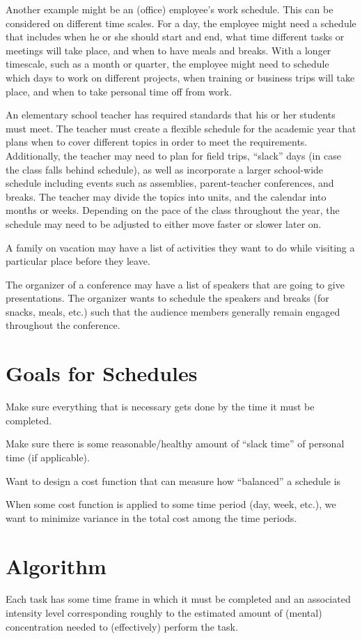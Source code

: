 \documentclass{article}
\begin{document}
	Another example might be an (office) employee's work schedule. This can be considered on different time scales. For a day, the employee might need a schedule that includes when he or she should start and end, what time different tasks or meetings will take place, and when to have meals and breaks. With a longer timescale, such as a month or quarter, the employee might need to schedule which days to work on different projects, when training or business trips will take place, and when to take personal time off from work.

	An elementary school teacher has required standards that his or her students must meet. The teacher must create a flexible schedule for the academic year that plans when to cover different topics in order to meet the requirements. Additionally, the teacher may need to plan for field trips, ``slack'' days (in case the class falls behind schedule), as well as incorporate a larger school-wide schedule including events such as assemblies, parent-teacher conferences, and breaks. The teacher may divide the topics into units, and the calendar into months or weeks. Depending on the pace of the class throughout the year, the schedule may need to be adjusted to either move faster or slower later on.

	A family on vacation may have a list of activities they want to do while visiting a particular place before they leave.

	The organizer of a conference may have a list of speakers that are going to give presentations. The organizer wants to schedule the speakers and breaks (for snacks, meals, etc.) such that the audience members generally remain engaged throughout the conference.

\newpage
\section{Goals for Schedules}
	Make sure everything that is necessary gets done by the time it must be completed.

	Make sure there is some reasonable/healthy amount of ``slack time'' of personal time (if applicable).

	Want to design a cost function that can measure how ``balanced'' a schedule is

	When some cost function is applied to some time period (day, week, etc.), we want to minimize variance in the total cost among the time periods.

\newpage
\section{Algorithm}
	Each task has some time frame in which it must be completed and an associated intensity level corresponding roughly to the estimated amount of (mental) concentration needed to (effectively) perform the task. 
\end{document}
